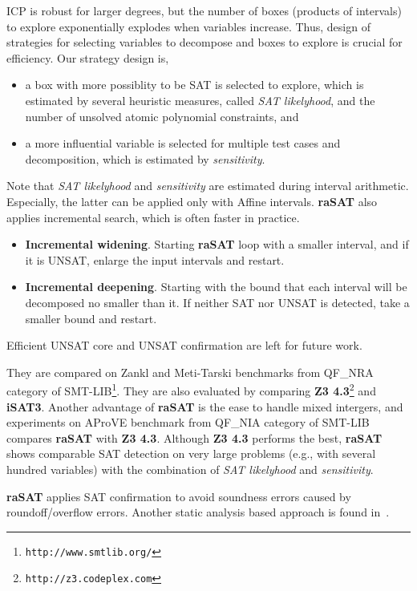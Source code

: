 ICP is robust for larger degrees, but the number of boxes (products of intervals) to explore 
exponentially explodes when variables increase. 
Thus, design of strategies for selecting variables to decompose and boxes to explore is crucial 
for efficiency. Our strategy design is, 
\begin{itemize}
\item a box with more possiblity to be SAT is selected to explore, which is estimated by 
several heuristic measures, called {\em SAT likelyhood}, 
and the number of unsolved atomic polynomial constraints, and
\item a more influential variable is selected for multiple test cases and decomposition, 
which is estimated by {\em sensitivity}. 
\end{itemize} 
Note that {\em SAT likelyhood} and {\em sensitivity} are estimated during interval arithmetic. 
Especially, the latter can be applied only with Affine intervals. 
{\bf raSAT} also applies incremental search, which is often faster in practice. 
\begin{itemize}
\item {\bf Incremental widening}. 
Starting {\bf raSAT} loop with a smaller interval, and if it is UNSAT, enlarge the input intervals
and restart. 
\item {\bf Incremental deepening}. 
Starting with the bound that each interval will be decomposed no smaller than it. 
If neither SAT nor UNSAT is detected, take a smaller bound and restart. 
\end{itemize} 
Efficient UNSAT core and UNSAT confirmation %
are left for future work. 

They are compared on Zankl and Meti-Tarski benchmarks from 
QF\_NRA category of SMT-LIB\footnote{\tt http://www.smtlib.org/}. 
They are also evaluated by comparing 
{\bf Z3 4.3}\footnote{\tt http://z3.codeplex.com} and {\bf iSAT3}. 
Another advantage of {\bf raSAT} is the ease to handle mixed intergers, 
and experiments on AProVE benchmark from QF\_NIA category of SMT-LIB compares {\bf raSAT} with 
{\bf Z3 4.3}. 
Although {\bf Z3 4.3} performs the best, {\bf raSAT} shows comparable SAT detection on 
very large problems (e.g., with several hundred variables) with the combination of 
{\em SAT likelyhood} and {\em sensitivity}. 


\medskip 
{\bf raSAT} applies SAT confirmation to avoid soundness errors caused by roundoff/overflow errors. 
Another static analysis based approach is found in~\cite{SilvaTACAS12}. 
